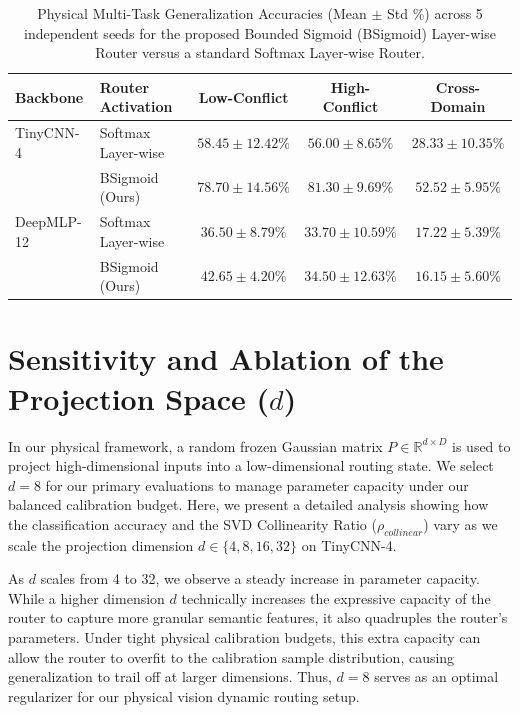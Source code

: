 \begin{table}[h]
\caption{Physical Multi-Task Generalization Accuracies (Mean $\pm$ Std \%) across 5 independent seeds for the proposed Bounded Sigmoid (BSigmoid) Layer-wise Router versus a standard Softmax Layer-wise Router.}
\label{tab:softmax_vs_bsigmoid_results}
\vskip 0.15in
\begin{center}
\begin{small}
\begin{sc}
\begin{tabular}{llccc}
\toprule
\textbf{Backbone} & \textbf{Router Activation} & \textbf{Low-Conflict} & \textbf{High-Conflict} & \textbf{Cross-Domain} \\
\midrule
TinyCNN-4 & Softmax Layer-wise & $58.45 \pm 12.42\%$ & $56.00 \pm 8.65\%$ & $28.33 \pm 10.35\%$ \\
          & BSigmoid (Ours) & $\mathbf{78.70 \pm 14.56\%}$ & $\mathbf{81.30 \pm 9.69\%}$ & $\mathbf{52.52 \pm 5.95\%}$ \\
\midrule
DeepMLP-12 & Softmax Layer-wise & $36.50 \pm 8.79\%$ & $33.70 \pm 10.59\%$ & $\mathbf{17.22 \pm 5.39\%}$ \\
           & BSigmoid (Ours) & $\mathbf{42.65 \pm 4.20\%}$ & $\mathbf{34.50 \pm 12.63\%}$ & $16.15 \pm 5.60\%$ \\
\bottomrule
\end{tabular}
\end{sc}
\end{small}
\end{center}
\end{table}

\section{Sensitivity and Ablation of the Projection Space ($d$)}
\label{app:projection_dimensionality}

In our physical framework, a random frozen Gaussian matrix $P \in \mathbb{R}^{d \times D}$ is used to project high-dimensional inputs into a low-dimensional routing state. We select $d=8$ for our primary evaluations to manage parameter capacity under our balanced calibration budget. Here, we present a detailed analysis showing how the classification accuracy and the SVD Collinearity Ratio ($\rho_{collinear}$) vary as we scale the projection dimension $d \in \{4, 8, 16, 32\}$ on TinyCNN-4.

As $d$ scales from 4 to 32, we observe a steady increase in parameter capacity. While a higher dimension $d$ technically increases the expressive capacity of the router to capture more granular semantic features, it also quadruples the router's parameters. Under tight physical calibration budgets, this extra capacity can allow the router to overfit to the calibration sample distribution, causing generalization to trail off at larger dimensions. Thus, $d=8$ serves as an optimal regularizer for our physical vision dynamic routing setup.

